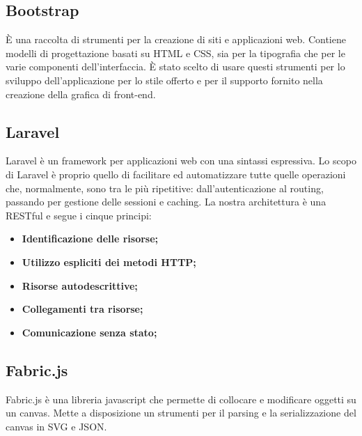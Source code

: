 \subsection{Bootstrap}
È una raccolta di strumenti per la creazione di siti e applicazioni web. Contiene modelli di progettazione basati su \gls{HTML} e \gls{CSS}, sia per la tipografia che per le varie componenti dell'interfaccia.
È stato scelto di usare questi strumenti per lo sviluppo dell'applicazione per lo stile offerto e per il supporto fornito nella creazione della grafica di \gls{front-end}.

\subsection{Laravel}
Laravel è un framework per applicazioni web con una sintassi espressiva. Lo scopo di Laravel è proprio quello di facilitare ed automatizzare tutte quelle operazioni che, normalmente, sono tra le più ripetitive: dall'autenticazione al routing, passando per gestione delle sessioni e caching. La nostra architettura è una RESTful e segue i cinque principi:
\begin{itemize}
	\item \textbf{Identificazione delle risorse;}
	\item \textbf{Utilizzo espliciti dei metodi HTTP;}
	\item \textbf{Risorse autodescrittive;}
	\item \textbf{Collegamenti tra risorse;}
	\item \textbf{Comunicazione senza stato;}
\end{itemize} 

\subsection{Fabric.js}
Fabric.js è una libreria javascript che permette di collocare e modificare oggetti su un canvas. Mette a disposizione un strumenti per il parsing e la serializzazione del canvas in SVG e JSON.